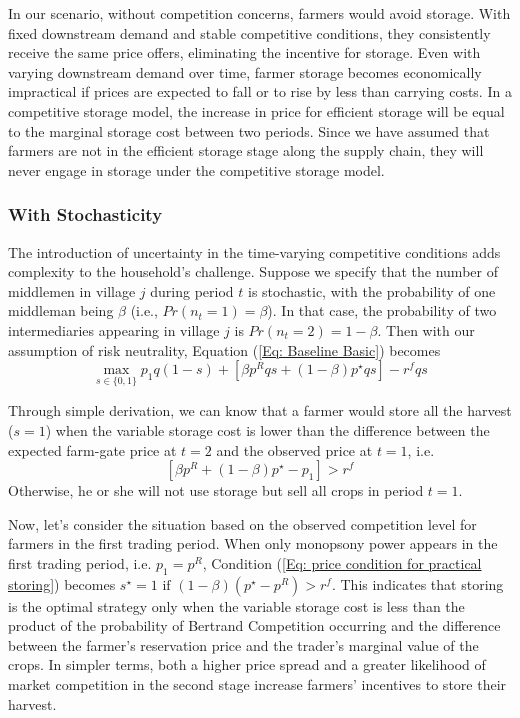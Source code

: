 In our scenario, without competition concerns, farmers would avoid storage. With fixed downstream demand and stable competitive conditions, they consistently receive the same price offers, eliminating the incentive for storage. Even with varying downstream demand over time, farmer storage becomes economically impractical if prices are expected to fall or to rise by less than carrying costs. In a competitive storage model, the increase in price for efficient storage will be equal to the marginal storage cost between two periods. Since we have assumed that farmers are not in the efficient storage stage along the supply chain, they will never engage in storage under the competitive storage model.




\subsubsection{With Stochasticity}
\noindent The introduction of uncertainty in the time-varying competitive conditions adds complexity to the household's challenge. Suppose we specify that the number of middlemen in village $j$ during period $t$ is stochastic, with the probability of one middleman being $\beta$ (i.e., $Pr(n_t=1)=\beta$). In that case, the probability of two intermediaries appearing in village $j$ is $Pr(n_t = 2) = 1-\beta$. Then with our assumption of risk neutrality, Equation (\ref{Eq: Baseline Basic}) becomes
\begin{equation}
    \max _{s \in\{0,1\}} p_1 q(1-s)+\left[\beta p^Rqs + (1-\beta)p^\star qs\right] -r^f q s 
\end{equation}

Through simple derivation, we can know that a farmer would store all the harvest ($s=1$) when the variable storage cost is lower than the difference between the expected farm-gate price at $t=2$ and the observed price at $t=1$, i.e.
\begin{equation}
    \left[ \beta p^R + (1-\beta)p^\star - p_1    \right] > r^f
    \label{Eq: price condition for practical storing}
\end{equation}
Otherwise, he or she will not use storage but sell all crops in period $t=1$. 

Now, let's consider the situation based on the observed competition level for farmers in the first trading period. When only monopsony power appears in the first trading period, i.e. $p_1=p^R$, Condition (\ref{Eq: price condition for practical storing}) becomes $ s^\star=1 \text{ if } (1-\beta)(p^\star - p^R) > r^f $. This indicates that storing is the optimal strategy only when the variable storage cost is less than the product of the probability of Bertrand Competition occurring and the difference between the farmer's reservation price and the trader's marginal value of the crops. In simpler terms, both a higher price spread and a greater likelihood of market competition in the second stage increase farmers' incentives to store their harvest.

